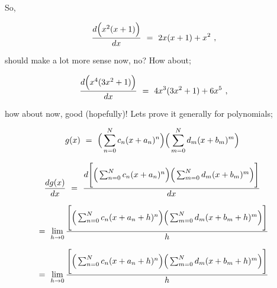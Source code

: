 \documentclass{article}
\begin{document}
So,

\begin{equation} \label{eq:327}
\frac{d \Big( x^2(x + 1)\Big)}{dx} \hspace{0.125cm} = \hspace{0.125cm} 2x(x + 1) + x^2 \hspace{0.125cm} ,
\end{equation}

should make a lot more sense now, no? How about;

\begin{equation} \label{eq:327}
\frac{d \Big( x^4(3x^2 + 1)\Big)}{dx} \hspace{0.125cm} = \hspace{0.125cm} 4x^3 (3x^2 + 1) + 6 x^5 \hspace{0.125cm} ,
\end{equation}

how about now, good (hopefully)! Lets prove it generally for polynomials;

\begin{equation} \label{eq:328}
g(x) \hspace{0.125cm} = \hspace{0.125cm} \Big( \sum_{n=0}^{N} c_n ( x + a_n )^n \Big) \Big( \sum_{m=0}^{N} d_m ( x + b_m )^m \Big) \hspace{0.125cm} 
\end{equation}

\begin{equation} \label{eq:329}
\frac{d g(x)}{dx} \hspace{0.125cm} = \hspace{0.125cm} \frac{d \Bigg[ \Big( \sum_{n=0}^{N} c_n ( x + a_n )^n \Big) \Big( \sum_{m=0}^{N} d_m ( x + b_m )^m \Big) \Bigg]}{dx} \hspace{0.125cm} 
\end{equation}

\begin{equation} \label{eq:330}
= \hspace{0.125cm} \lim_{h\to0} \frac{\Bigg[ \Big( \sum_{n=0}^{N} c_n ( x + a_n + h)^n \Big) \Big( \sum_{m=0}^{N} d_m ( x + b_m + h)^m \Big) \Bigg]}{h}
\end{equation}

\begin{equation} \label{eq:331}
= \hspace{0.125cm} \lim_{h\to0} \frac{\Bigg[ \Big( \sum_{n=0}^{N} c_n ( x + a_n + h)^n \Big) \Big( \sum_{m=0}^{N} d_m ( x + b_m + h)^m \Big) \Bigg]}{h}
\end{equation}
\end{document}
